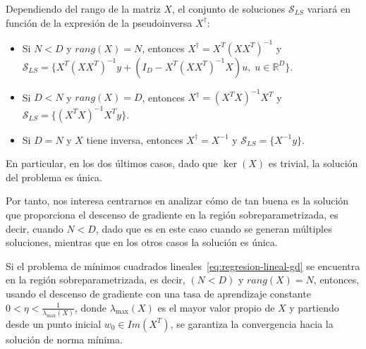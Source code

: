 \begin{observacion}
    Dependiendo del rango de la matriz $X$, el conjunto de soluciones $\mathcal{S}_{LS}$ variará en función de la expresión de la pseudoinversa $X^{\dagger}$:

    \begin{itemize}
        \item Si $N < D$ y $rang(X) = N$, entonces $X^{\dagger} = X^{T}{(XX^{T})}^{-1}$ y $\mathcal{S}_{LS} = \{ X^{T}{(XX^{T})}^{-1}y + (I_D-X^{T}{(XX^{T})}^{-1}X)u, \; u \in \mathbb{R}^{D} \}$.
        
        \item Si $D < N$ y $rang(X) = D$, entonces $X^{\dagger} = {(X^{T}X)}^{-1}X^{T}$ y $\mathcal{S}_{LS} = \{ {(X^{T}X)}^{-1}X^{T}y \}$.
        
        \item Si $D = N$ y $X$ tiene inversa, entonces $X^{\dagger} = {X}^{-1}$ y $\mathcal{S}_{LS} = \{{X}^{-1}y \}$.
    \end{itemize}

    En particular, en los dos últimos casos, dado que $\ker(X)$ es trivial, la solución del problema es única.
\end{observacion}

Por tanto, nos interesa centrarnos en analizar cómo de tan buena es la solución que proporciona el descenso de gradiente en la región sobreparametrizada, es decir, cuando $N < D$, dado que es en este caso cuando se generan múltiples soluciones, mientras que en los otros casos la solución es única.

\begin{teorema}
    Si el problema de mínimos cuadrados lineales~\eqref{eq:regresion-lineal-gd} se encuentra en la región sobreparametrizada, es decir, $(N < D)$ y $rang(X) = N$, entonces, usando el descenso de gradiente con una tasa de aprendizaje constante $0 < \eta < \frac{1}{\lambda_{\max}(X)}$, donde $\lambda_{\max}(X)$ es el mayor valor propio de $X$ y partiendo desde un punto inicial $w_0 \in Im(X^{T})$, se garantiza la convergencia hacia la solución de norma mínima.
\end{teorema}

